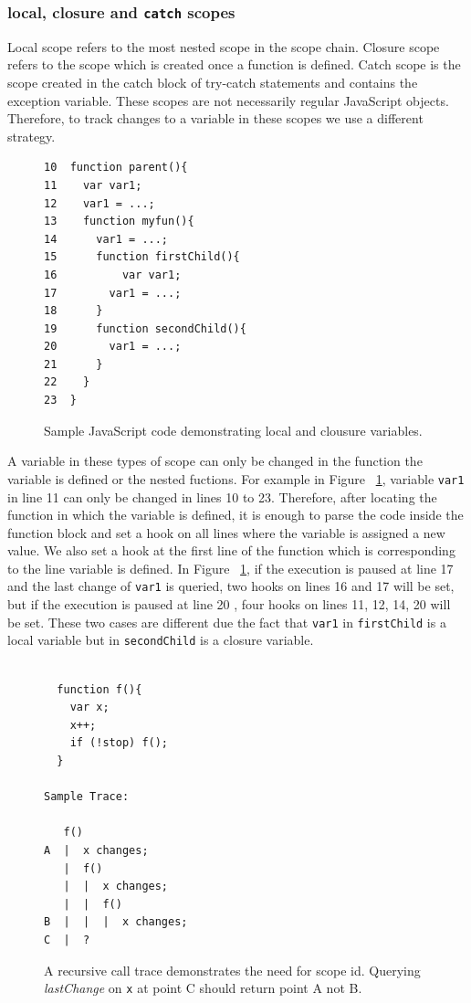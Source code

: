 \documentclass[preprint]{sigplanconf}
\begin{document}
\subsubsection{local, closure and \texttt{catch} scopes}
Local scope refers to the most nested scope in the scope chain. Closure scope refers to the scope which is created once a function is defined. Catch scope is the scope created in the catch block of try-catch statements and contains the exception variable. These scopes are not necessarily regular JavaScript objects. Therefore, to track changes to a variable in these scopes we use a different strategy. 

\begin{figure}[htp]
\begin{verbatim}
10  function parent(){
11    var var1;
12    var1 = ...;
13    function myfun(){
14      var1 = ...;
15      function firstChild(){
16       	var var1;
17        var1 = ...;
18      }  
19      function secondChild(){
20        var1 = ...;			      
21      }
22    }  
23  }    
\end{verbatim}
\caption{Sample JavaScript code demonstrating local and clousure variables.}
\label{fig:js-closure}
\end{figure}

A variable in these types of scope can only be changed in the function the variable is defined or the nested fuctions. For example in Figure ~\ref{fig:js-closure}, variable \texttt{var1} in line 11 can only be changed in lines 10 to 23. Therefore, after locating the function in which the variable is defined, it is enough to parse the code inside the function block and set a hook on all lines where the variable is assigned a new value. %
We also set a hook at the first line of the function which is corresponding to the line variable is defined. In Figure ~\ref{fig:js-closure}, if the execution is paused at line 17 and the last change of \texttt{var1} is queried, two hooks on lines 16 and 17 will be set, but if the execution is paused at line 20 , four hooks on lines 11, 12, 14, 20 will be set. These two cases are different due the fact that \texttt{var1} in \texttt{firstChild} is a local variable but in \texttt{secondChild} is a closure variable.

\begin{figure}[htp]
\begin{verbatim}

  function f(){
    var x;
    x++;
    if (!stop) f();
  }

Sample Trace:

   f()
A  |  x changes; 
   |  f()
   |  |  x changes;
   |  |  f()
B  |  |  |  x changes; 
C  |  ?

\end{verbatim}
\caption{A recursive call trace demonstrates the need for scope id. Querying \textit{lastChange} on \texttt{x} at point C should return point A not B.}
\label{fig:recursive}
\end{figure}
\end{document}
